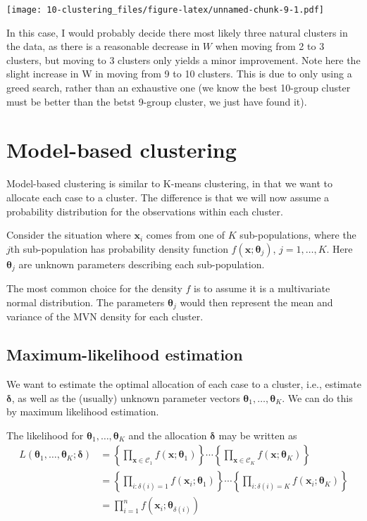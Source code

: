 \documentclass[
]{book}
\theoremstyle{definition}
\theoremstyle{definition}
\theoremstyle{definition}
\theoremstyle{definition}
\theoremstyle{remark}
\begin{document}
\texttt{[image: 10-clustering\_files/figure-latex/unnamed-chunk-9-1.pdf]}

In this case, I would probably decide there most likely three natural clusters in the data, as there is a reasonable decrease in \(W\) when moving from 2 to 3 clusters, but moving to 3 clusters only yields a minor improvement. Note here the slight increase in W in moving from 9 to 10 clusters. This is due to only using a greed search, rather than an exhaustive one (we know the best 10-group cluster must be better than the betst 9-group cluster, we just have found it).

\section{Model-based clustering}\label{model-based-clustering}

Model-based clustering is similar to K-means clustering, in that we want to allocate each case to a cluster. The difference is that we will now assume a probability distribution for the observations within each cluster.

Consider the situation where \(\mathbf x_i\) comes from one of \(K\) sub-populations, where the \(j\)th sub-population has
probability density function \(f(\mathbf x; \boldsymbol \theta_j)\), \(j=1,\ldots , K\). Here \(\boldsymbol \theta_j\) are unknown parameters describing each sub-population.

The most common choice for the density \(f\) is to assume it is a multivariate normal distribution. The parameters \(\boldsymbol \theta_j\) would then represent the mean and variance of the MVN density for each cluster.

\subsection{Maximum-likelihood estimation}\label{maximum-likelihood-estimation}

We want to estimate the optimal allocation of each case to a cluster, i.e., estimate \(\boldsymbol \delta\), as well as the (usually) unknown parameter vectors \(\boldsymbol \theta_1, \ldots , \boldsymbol \theta_K\). We can do this by maximum likelihood estimation.

The likelihood for \(\boldsymbol \theta_1, \ldots , \boldsymbol \theta_K\) and the allocation \(\boldsymbol \delta\) may be written as
\begin{align*}
L(\boldsymbol \theta_1,\ldots , \boldsymbol \theta_K; \boldsymbol \delta)&=\left \{\prod_{\mathbf x\in \mathcal{C}_1} f(\mathbf x; \boldsymbol \theta_1)\right \}\cdots \left \{\prod_{\mathbf x\in \mathcal{C}_K} f(\mathbf x; \boldsymbol \theta_K)\right \}\\
&=\left \{\prod_{i: \delta(i)=1} f(\mathbf x_i; \boldsymbol \theta_1)\right \}\cdots \left \{\prod_{i: \delta(i)=K} f(\mathbf x_i; \boldsymbol \theta_K)\right \}\\
&= \prod_{i=1}^n f(\mathbf x_i; \boldsymbol \theta_{\delta(i)})
\end{align*}
\end{document}
